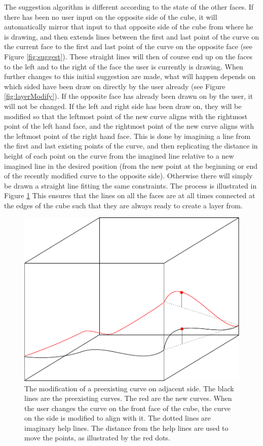\documentclass[a4paper,12pt]{report}
\begin{document}
The suggestion algorithm is different according to the state of the other faces. If there has been no user input on the opposite side of the cube, it will automatically mirror that input to that opposite side of the cube from where he is drawing, and then extends lines between the first and last point of the curve on the current face to the first and last point of the curve on the opposite face (see Figure \ref{fig:suggest}). These straight lines will then of course end up on the faces to the left and to the right of the face the user is currently is drawing. When further changes to this initial suggestion are made, what will happen depends on which sided have been draw on directly by the user already (see Figure \ref{fig:layerModify}). If the opposite face has already been drawn on by the user, it will not be changed. If the left and right side has been draw on, they will be modified so that the leftmost point of the new curve aligns with the rightmost point of the left hand face, and the rightmost point of 
the new curve aligns with the leftmost point of the right hand face.
 This is done by imagining a line from the first and last existing points of the curve, and then replicating the distance in height of each point on the curve from the imagined line relative to a new imagined line in the desired position (from the new point at the beginning or end of the recently modified curve to the opposite side). Otherwise there will simply be drawn a straight line fitting the same 
constraints. The process is illustrated in Figure \ref{fig:changeSide} This ensures that the lines on all the faces are at all times connected at the edges of the cube such that they are always ready to create a layer from.

\begin{figure}
\centering
\includegraphics[width=.8\linewidth]{thesis/changeSide.pdf}
 \caption{The modification of a preexisting curve on adjacent side. The black lines are the preexisting curves. The red are the new curves. When the user changes the curve on the front face of the cube, the curve on the side is modified to align with it. The dotted lines are imaginary help lines. The distance from the help lines are used to move the points, as illustrated by the red dots.}
 \label{fig:changeSide}
\end{figure}
\end{document}
